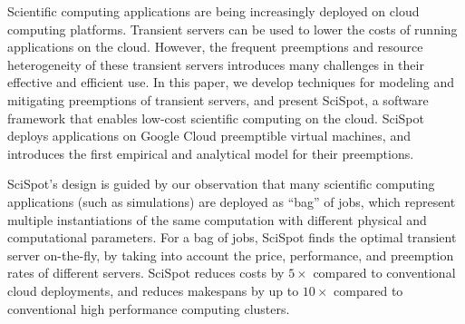 Scientific computing applications are being increasingly deployed on cloud computing platforms.
Transient servers can be used to lower the costs of running applications on the cloud.
However, the frequent preemptions and resource heterogeneity of these transient servers introduces many challenges in their effective and efficient use.
In this paper, we develop techniques for modeling and mitigating preemptions of transient servers, and present SciSpot, a software framework that enables low-cost scientific computing on the cloud. 
SciSpot deploys applications on Google Cloud preemptible virtual machines, and introduces the first empirical and analytical model for their preemptions. 

\noindent SciSpot's design is guided by our observation that many scientific computing applications (such as simulations) are deployed as ``bag'' of jobs, which represent multiple instantiations of the same computation with different physical and computational parameters. 
For a bag of jobs, SciSpot finds the optimal transient server on-the-fly, by taking into account the price, performance, and preemption rates of different servers. 
SciSpot reduces costs by $5\times$ compared to conventional cloud deployments, and reduces  makespans by up to $10\times$ compared to conventional high performance computing clusters.


%






